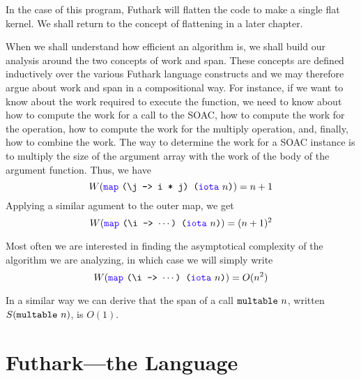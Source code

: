 \documentclass[oneside,11pt]{book}
\newenvironment{wrap}{\vspace{\topskip}\par\noindent\begin{minipage}{\linewidth}}{\end{minipage}\par}
\begin{document}
\begin{wrap}

\end{wrap}

\noindent
In the case of this program, Futhark will flatten the code to make a
single flat kernel. We shall return to the concept of flattening in a
later chapter.

When we shall understand how efficient an algorithm is, we shall build
our analysis around the two concepts of work and span. These concepts
are defined inductively over the various Futhark language constructs
and we may therefore argue about work and span in a compositional
way. For instance, if we want to know about the work required to
execute the  function, we need to know about how to
compute the work for a call to the  SOAC, how to compute the
work for the  operation, how to compute the work for the
multiply operation, and, finally, how to combine the work. The way to
determine the work for a  SOAC instance is to multiply the
size of the argument array with the work of the body of the argument
function. Thus, we have
$$ W(\fop{map}~\kw{(\textbackslash{}j -> i * j) (}\fop{iota}~\kw{$n$)}) = n+1 $$
Applying a similar agument to the outer map, we get
$$W(\fop{map}~\kw{(\textbackslash{}i -> $\cdots$) (}\fop{iota}~\kw{$n$)}) = (n+1)^2 $$

\noindent
Most often we are interested in finding the asymptotical complexity of
the algorithm we are analyzing, in which case we will simply write
$$W(\fop{map}~\kw{(\textbackslash{}i -> $\cdots$) (}\fop{iota}~\kw{$n$)}) = O(n^2) $$

In a similar way we can derive that the span of a call
$\texttt{multable}~n$, written $S(\texttt{multable}~n)$, is $O(1)$.


\section{Futhark---the Language}
\end{document}
